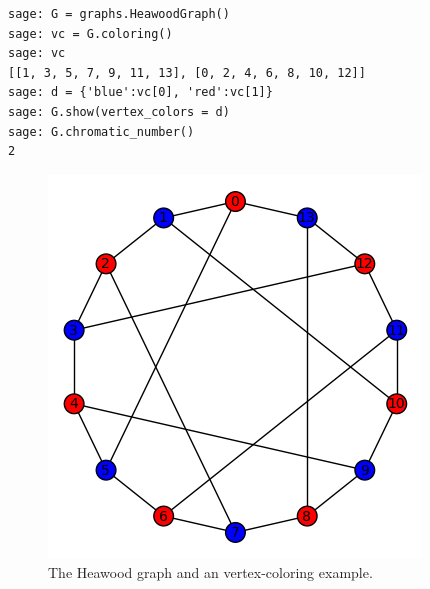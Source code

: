 \begin{example}
\begin{lstlisting}
sage: G = graphs.HeawoodGraph()
sage: vc = G.coloring()
sage: vc
[[1, 3, 5, 7, 9, 11, 13], [0, 2, 4, 6, 8, 10, 12]]
sage: d = {'blue':vc[0], 'red':vc[1]}
sage: G.show(vertex_colors = d)       
sage: G.chromatic_number()
2
\end{lstlisting}


\begin{figure}[!htbp]
\centering
{}
\includegraphics[scale=0.7]{image/graph-coloring/heawood-graph-vertex-coloring-example}
\caption{The Heawood graph and an vertex-coloring example.}
\label{fig:graph-coloring:heawood-graph-vertex-coloring-example}
\end{figure}


\end{example}


